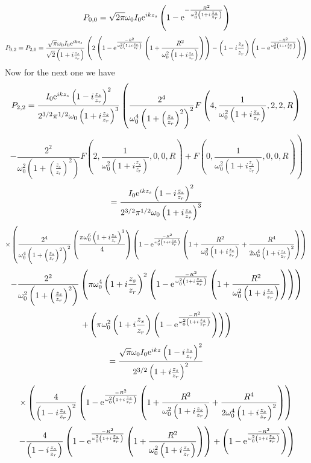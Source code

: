 \documentclass[11pt]{amsart}
\makeatletter
\newcommand{\e}{{\rm e}}				%
\newcommand{\0}{\varnothing}		%
\newcommand{\1}{!}
\newcommand{\2}{@}
\newcommand{\3}{\#}
\newcommand{\4}{\$}
\newcommand{\5}{\%}
\newcommand{\6}{$^\wedge$}
\newcommand{\7}{\&}
\newcommand{\8}{*}
\newcommand{\9}{(}
\makeatother
\begin{document}
\[
P_{0,0} = \sqrt{2\pi}\omega_0I_0\e^{ikz_s}\left(1-\e^{-\frac{R^2}{\omega_0^2\left(1+i\frac{z_s}{z_r}\right)}}\right)
\]
\[
P_{0,2} = P_{2,0} =\frac{\sqrt{\pi}\omega_0I_0\e^{ikz_s}}{\sqrt{2}\left(1+i\frac{z_s}{z_r}\right)}\left(2\left(1-\e^{\frac{-R^2}{\omega_0^2\left(1+i\frac{z_s}{z_r}\right)}}\left(1+\frac{R^2}{\omega_0^2\left(1+i\frac{z_s}{z_r}\right)}\right)\right) - \left(1-i\frac{z_s}{z_r}\right)\left(1-\e^{\frac{-R^2}{\omega_0^2\left(1+i\frac{z_s}{z_r}\right)}}\right)\right)
\]
Now for the next one we have
\[
P_{2,2} = \frac{I_0\e^{ikz_s}\left(1-i\frac{z_s}{z_r}\right)^2}{2^{3/2}\pi^{1/2}\omega_0\left(1+i\frac{z_s}{z_r}\right)^3}\left(\frac{2^4}{\omega_0^4\left(1+\left(\frac{z_s}{z_r}\right)^2\right)^2}F\left(4,\frac{1}{\omega_0^2\left(1+i\frac{z_s}{z_r}\right)},2,2,R\right) \right.\]\[\left.-\frac{2^2}{\omega_0^2\left(1+\left(\frac{z_s}{z_r}\right)^2\right)}F\left(2,\frac{1}{\omega_0^2\left(1+i\frac{z_s}{z_r}\right)},0,0,R\right)+F\left(0,\frac{1}{\omega_0^2\left(1+i\frac{z_s}{z_r}\right)},0,0,R\right)\right)
\]
\[
= \frac{I_0\e^{ikz_s}\left(1-i\frac{z_s}{z_r}\right)^2}{2^{3/2}\pi^{1/2}\omega_0\left(1+i\frac{z_s}{z_r}\right)^3}
\]
\[
\times\left(\frac{2^4}{\omega_0^4\left(1+\left(\frac{z_s}{z_r}\right)^2\right)^2}\left(\frac{\pi\omega_0^6\left(1+i\frac{z_s}{z_r}\right)^3}{4}\right)\left(1-\e^{\frac{-R^2}{\omega_0^2\left(1+i\frac{z_s}{z_r}\right)}}\left(1+\frac{R^2}{\omega_0^2\left(1+i\frac{z_s}{z_r}\right)}+\frac{R^4}{2\omega_0^4\left(1+i\frac{z_s}{z_r}\right)^2}\right)\right)\right.
\]
\[
\left. -\frac{2^2}{\omega_0^2\left(1+\left(\frac{z_s}{z_r}\right)^2\right)}\left(\pi\omega_0^4\left(1+i\frac{z_s}{z_r}\right)^2\left(1-\e^{\frac{-R^2}{\omega_0^2\left(1+i\frac{z_s}{z_r}\right)}}\left(1+\frac{R^2}{\omega_0^2\left(1+i\frac{z_s}{z_r}\right)}\right)\right)\right)\right.
\]
\[
\left.+\left(\pi\omega_0^2\left(1+i\frac{z_s}{z_r}\right)\left(1-\e^{\frac{-R^2}{\omega_0^2\left(1+i\frac{z_s}{z_r}\right)}}\right)\right)\right)
\]
\newpage
\[
=\frac{\sqrt{\pi}\omega_0I_0\e^{ikz}\left(1-i\frac{z_s}{z_r}\right)^2}{2^{3/2}\left(1+i\frac{z_s}{z_r}\right)^2}
\]
\[
\times\left( \frac{4}{\left(1-i\frac{z_s}{z_r}\right)^2}\left(1-\e^{\frac{-R^2}{\omega_0^2\left(1+i\frac{z_s}{z_r}\right)}}\left(1+\frac{R^2}{\omega_0^2\left(1+i\frac{z_s}{z_r}\right)}+\frac{R^4}{2\omega_0^4\left(1+i\frac{z_s}{z_r}\right)^2}\right)\right)\right.
\]
\[
\left. -\frac{4}{\left(1-i\frac{z_s}{z_r}\right)}\left(1-\e^{\frac{-R^2}{\omega_0^2\left(1+i\frac{z_s}{z_r}\right)}}\left(1+\frac{R^2}{\omega_0^2\left(1+i\frac{z_s}{z_r}\right)}\right)\right)+\left(1-\e^{\frac{-R^2}{\omega_0^2\left(1+i\frac{z_s}{z_r}\right)}}\right)\right)
\]
\end{document}
